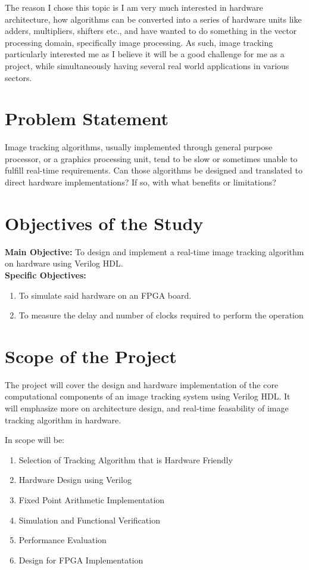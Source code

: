\documentclass[10pt,a4paper]{article}
\begin{document}
\noindent The reason I chose this topic is I am very much interested in hardware architecture, how algorithms can be converted into a series of hardware units like adders, 
multipliers, shifters etc., and have wanted to do something in the vector processing domain, specifically image processing. As such, image tracking particularly 
interested me as I believe it will be a good challenge for me as a project, while simultaneously having several real world applications in various sectors.

\section*{Problem Statement}
Image tracking algorithms, usually implemented through general purpose processor, or a graphics processing unit, tend to be slow or sometimes unable to fulfill real-time 
requirements. Can those algorithms be designed and translated to direct hardware implementations? If so, with what benefits or limitations?

\section*{Objectives of the Study}
\textbf{Main Objective:} To design and implement a real-time image tracking algorithm on hardware using Verilog HDL. \\
\textbf{Specific Objectives:} 
\begin{enumerate}
    \item To simulate said hardware on an FPGA board.    
    \item To measure the delay and number of clocks required to perform the operation

\end{enumerate}

\section*{Scope of the Project}
The project will cover the design and hardware implementation of the core computational components of an image tracking system using Verilog HDL. It will emphasize more on 
architecture design, and real-time feasability of image tracking algorithm in hardware. 

\noindent In scope will be:
\begin{enumerate}
    \item Selection of Tracking Algorithm that is Hardware Friendly
    \item Hardware Design using Verilog
    \item Fixed Point Arithmetic Implementation
    \item Simulation and Functional Verification
    \item Performance Evaluation
    \item Design for FPGA Implementation
\end{enumerate}
\end{document}
